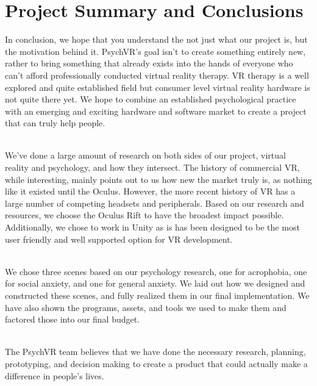 \documentclass[a4paper,10pt]{article}
\begin{document}
\section{Project Summary and Conclusions}
In conclusion, we hope that you understand the not just what our project is, but the motivation behind it. PsychVR's goal isn't to create something entirely new, rather to bring something that already exists into the hands of everyone who can't afford professionally conducted virtual reality therapy. VR therapy is a well explored and quite established field but consumer level virtual reality hardware is not quite there yet. We hope to combine an established psychological practice with an emerging and exciting hardware and software market to create a project that can truly help people. 
\par ~\\
We've done a large amount of research on both sides of our project, virtual reality and psychology, and how they intersect. The history of commercial VR, while interesting, mainly points out to us how new the market truly is, as nothing like it existed until the Oculus. However, the more recent history of VR has a large number of competing headsets and peripherals. Based on our research and resources, we choose the Oculus Rift to have the broadest impact possible. Additionally, we chose to work in Unity as is has been designed to be the most user friendly and well supported option for VR development.  
\par ~\\
We chose three scenes based on our psychology research, one for acrophobia, one for social anxiety, and one for general anxiety.  We laid out how we designed and constructed these scenes, and fully realized them in our final implementation. We have also shown the programs, assets, and tools we used to make them and factored those into our final budget.
\par ~\\
The PsychVR team believes that we have done the necessary research, planning, prototyping, and decision making to create a product that could actually make a difference in people's lives.
\pagebreak

\setcounter{page}{0}
\end{document}
